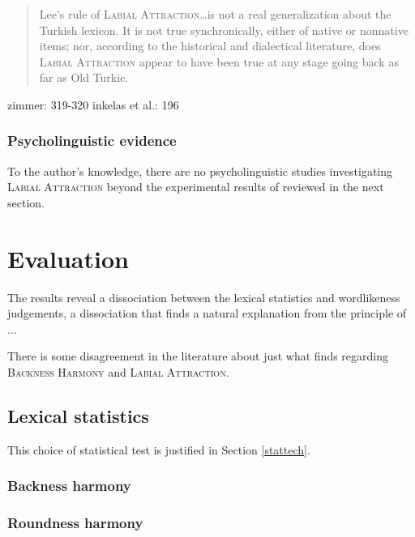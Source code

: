 \begin{quote}
Lee's rule of \textsc{Labial Attraction}\ldots is not a real generalization about the Turkish lexicon. It is not true synchronically, either of native or nonnative items; nor, according to the historical and dialectical literature, does \textsc{Labial Attraction} appear to have been true at any stage going back as far as Old Turkic. \citep[][196]{Inkelas2001}
\end{quote}

zimmer: 319-320 
inkelas et al.: 196

\subsubsection{Psycholinguistic evidence}

To the author's knowledge, there are no psycholinguistic studies investigating \textsc{Labial Attraction} beyond the experimental results of \citet{Zimmer1969} reviewed in the next section. 

\section{Evaluation}

The results reveal a dissociation between the lexical statistics and wordlikeness judgements, a dissociation that finds a natural explanation from the principle of ...

There is some disagreement in the literature about just what \citet{Zimmer1969} finds regarding \textsc{Backness Harmony} and \textsc{Labial Attraction}.

\subsection{Lexical statistics} \label{lexstats}

This choice of statistical test is justified in Section \ref{stattech}.

\subsubsection{Backness harmony}

\subsubsection{Roundness harmony}


